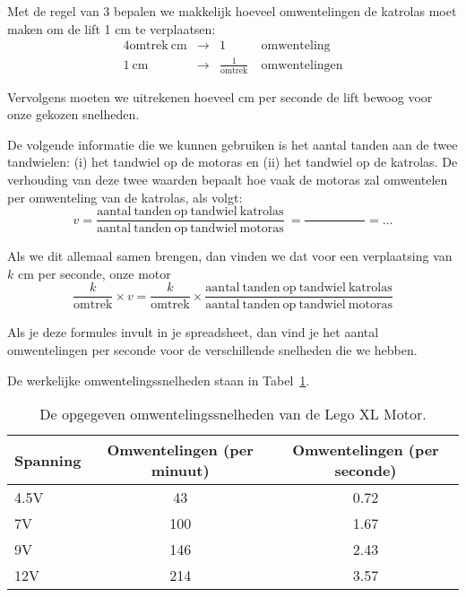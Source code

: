 \documentclass[a4paper, 10pt]{article}
\begin{document}
Met de regel van 3 bepalen we makkelijk hoeveel omwentelingen de katrolas moet maken om de lift 1 cm te verplaatsen:
\begin{alignat}{4}
\mathrm{omtrek}\ \mathrm{cm} & \rightarrow & 1\  & \mathrm{omwenteling}\\
1\ \mathrm{cm}               & \rightarrow & \frac{1}{\mathrm{omtrek}}\  & \mathrm{omwentelingen}
\end{alignat}

Vervolgens moeten we uitrekenen hoeveel cm per seconde de lift bewoog voor onze gekozen snelheden.

De volgende informatie die we kunnen gebruiken is het aantal tanden aan de twee tandwielen: (i) het tandwiel op de
motoras en (ii) het tandwiel op de katrolas. De verhouding van deze twee waarden bepaalt hoe vaak de motoras zal
omwentelen per omwenteling van de katrolas, als volgt:
\begin{equation}
v = \frac{\mathrm{aantal\ tanden\ op\ tandwiel\ katrolas}}{\mathrm{aantal\ tanden\ op\ tandwiel\ motoras}}\ = \frac{\hspace{2cm}}{} = \ldots
\end{equation}

Als we dit allemaal samen brengen, dan vinden we dat voor een verplaatsing van $k$ cm per seconde, onze motor
\begin{equation}
\frac{k}{\mathrm{omtrek}} \times v = \frac{k}{\mathrm{omtrek}} \times
\frac{\mathrm{aantal\ tanden\ op\ tandwiel\ katrolas}}{\mathrm{aantal\ tanden\ op\ tandwiel\ motoras}}
\end{equation}

Als je deze formules invult in je spreadsheet, dan vind je het aantal omwentelingen per seconde voor de verschillende
snelheden die we hebben.

De werkelijke omwentelingssnelheden staan in Tabel~\ref{table:legomotorxl}.

\begin{table}
\begin{center}
\begin{tabular}{lcc}
    \toprule
    Spanning & Omwentelingen (per minuut) & Omwentelingen (per seconde)\\
    \midrule
    4.5V & 43  & 0.72\\
    7V   & 100 & 1.67\\
    9V   & 146 & 2.43\\
    12V  & 214 & 3.57\\
    \bottomrule
\end{tabular}
\end{center}
\caption{De opgegeven omwentelingssnelheden van de Lego XL Motor.}
\label{table:legomotorxl}
\end{table}
\end{document}
